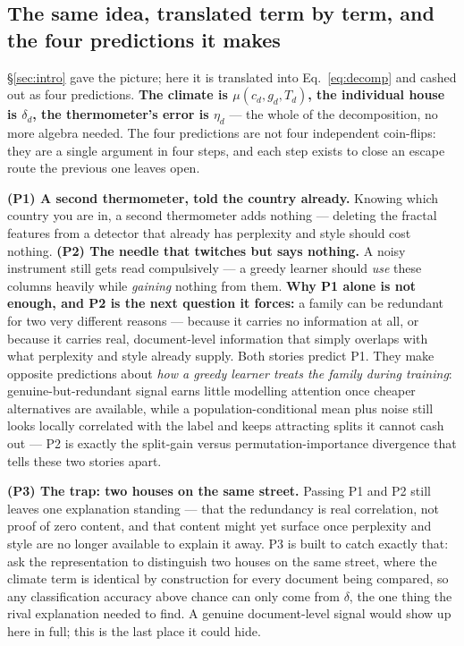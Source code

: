 \documentclass{article}
\begin{document}
\subsection{The same idea, translated term by term, and the four predictions it makes}
\label{sec:analogy}

\S\ref{sec:intro} gave the picture; here it is translated into
Eq.~\ref{eq:decomp} and cashed out as four predictions. \textbf{The climate
is $\mu(c_d,g_d,T_d)$, the individual house is $\delta_d$, the thermometer's
error is $\eta_d$} --- the whole of the decomposition, no more algebra
needed. The four predictions are not four independent coin-flips: they are
a single argument in four steps, and each step exists to close an escape
route the previous one leaves open.

\textbf{(P1) A second thermometer, told the country already.} Knowing which
country you are in, a second thermometer adds nothing --- deleting the
fractal features from a detector that already has perplexity and style
should cost nothing. \textbf{(P2) The needle that twitches but says
nothing.} A noisy instrument still gets read compulsively --- a greedy
learner should \emph{use} these columns heavily while \emph{gaining}
nothing from them. \textbf{Why P1 alone is not enough, and P2 is the next
question it forces:} a family can be redundant for two very different
reasons --- because it carries no information at all, or because it carries
real, document-level information that simply overlaps with what perplexity
and style already supply. Both stories predict P1. They make opposite
predictions about \emph{how a greedy learner treats the family during
training}: genuine-but-redundant signal earns little modelling attention
once cheaper alternatives are available, while a population-conditional
mean plus noise still looks locally correlated with the label and keeps
attracting splits it cannot cash out --- P2 is exactly the split-gain
versus permutation-importance divergence that tells these two stories
apart.

\textbf{(P3) The trap: two houses on the same street.} Passing P1 and P2
still leaves one explanation standing --- that the redundancy is real
correlation, not proof of zero content, and that content might yet surface
once perplexity and style are no longer available to explain it away. P3 is
built to catch exactly that: ask the representation to distinguish two
houses on the same street, where the climate term is identical by
construction for every document being compared, so any classification
accuracy above chance can only come from $\delta$, the one thing the rival
explanation needed to find. A genuine document-level signal would show up
here in full; this is the last place it could hide.
\end{document}

